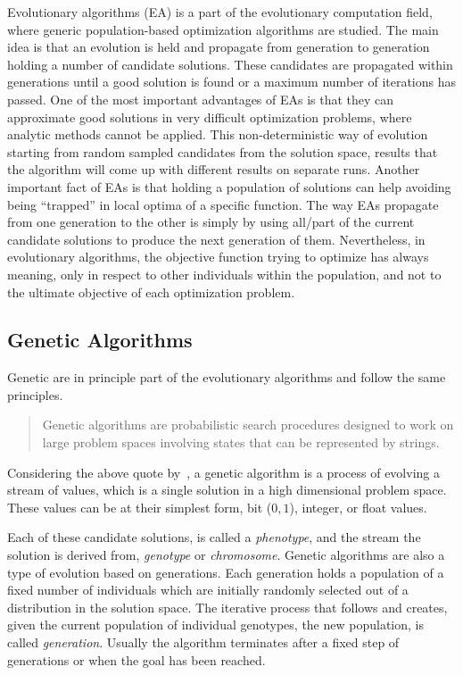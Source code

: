 Evolutionary algorithms (EA) is a part of the evolutionary computation field, where generic population-based optimization algorithms are studied. The main idea is that an evolution is held and propagate from generation to generation holding a number of candidate solutions. These candidates are propagated within generations until a good solution is found or a maximum number of iterations has passed. One of the most important advantages of EAs is that they can approximate good solutions in very difficult optimization problems, where analytic methods cannot be applied. This non-deterministic way of evolution starting from random sampled candidates from the solution space, results that the algorithm will come up with different results on separate runs. Another important fact of EAs is that holding a population of solutions can help avoiding being ``trapped'' in local optima of a specific function. The way EAs propagate from one generation to the other is simply by using all/part of the current candidate solutions to produce the next generation of them. Nevertheless, in evolutionary algorithms, the objective function trying to optimize has always meaning, only in respect to other individuals within the population, and not to the ultimate objective of each optimization problem.




\subsection{Genetic Algorithms}
Genetic are in principle part of the evolutionary algorithms and follow the same principles.

\begin{quote}Genetic algorithms are probabilistic search procedures designed to work on
large problem spaces involving states that can be represented by strings.\end{quote}

Considering the above quote by~\cite{goldberg1988genetic}, a genetic algorithm is a process of evolving a stream of values, which is a single solution in a high dimensional problem space. These values can be at their simplest form, bit ($0, 1$), integer, or float values. 

Each of these candidate solutions, is called a \emph{phenotype}, and the stream the solution is derived from, \emph{genotype} or \emph{chromosome}. Genetic algorithms are also a type of evolution based on generations. Each generation holds a population of a fixed number of individuals which are initially randomly selected out of a distribution in the solution space. The iterative process that follows and creates, given the current population of individual genotypes, the new population, is called \emph{generation}. Usually the algorithm terminates after a fixed step of generations or when the goal has been reached. 

